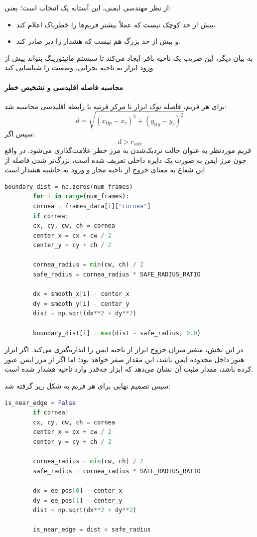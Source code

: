 \documentclass{article}
\begin{document}
از نظر مهندسی ایمنی، این آستانه یک انتخاب  است؛ یعنی:
\begin{itemize}
	\item بیش از حد کوچک نیست که عملاً بیشتر فریم‌ها را خطرناک اعلام کند،
	\item و بیش از حد بزرگ هم نیست که هشدار را دیر صادر کند.
\end{itemize}
به بیان دیگر، این ضریب یک ناحیه بافر ایجاد می‌کند تا سیستم مانیتورینگ بتواند پیش از ورود ابزار به ناحیه بحرانی، وضعیت را شناسایی کند.

\paragraph{محاسبه فاصله اقلیدسی و تشخیص خطر}
برای هر فریم، فاصله نوک ابزار تا مرکز قرنیه با رابطه اقلیدسی محاسبه شد:
\[
d = \sqrt{(x_{\text{tip}} - x_c)^2 + (y_{\text{tip}} - y_c)^2}
\]
سپس اگر:
\[
d > r_{\text{safe}}
\]
فریم موردنظر به عنوان حالت نزدیک‌شدن به مرز خطر علامت‌گذاری می‌شود. در واقع چون مرز ایمن به صورت یک دایره داخلی تعریف شده است، بزرگ‌تر شدن فاصله از این شعاع به معنای خروج از ناحیه مجاز و ورود به حاشیه هشدار است.


\begin{latin}
	\begin{lstlisting}[language=Python, basicstyle=\ttfamily\scriptsize]
		boundary_dist = np.zeros(num_frames)
		for i in range(num_frames):
		cornea = frames_data[i]["cornea"]
		if cornea:
		cx, cy, cw, ch = cornea
		center_x = cx + cw / 2
		center_y = cy + ch / 2
		
		cornea_radius = min(cw, ch) / 2
		safe_radius = cornea_radius * SAFE_RADIUS_RATIO
		
		dx = smooth_x[i] - center_x
		dy = smooth_y[i] - center_y
		dist = np.sqrt(dx**2 + dy**2)
		
		boundary_dist[i] = max(dist - safe_radius, 0.0)
	\end{lstlisting}
\end{latin}

در این بخش، متغیر  میزان خروج ابزار از ناحیه ایمن را اندازه‌گیری می‌کند. اگر ابزار هنوز داخل محدوده ایمن باشد، این مقدار صفر خواهد بود؛ اما اگر از مرز ایمن عبور کرده باشد، مقدار مثبت آن نشان می‌دهد که ابزار چه‌قدر وارد ناحیه هشدار شده است.

سپس تصمیم نهایی برای هر فریم به شکل زیر گرفته شد:


\begin{latin}
	\begin{lstlisting}[language=Python, basicstyle=\ttfamily\scriptsize]
		is_near_edge = False
		if cornea:
		cx, cy, cw, ch = cornea
		center_x = cx + cw / 2
		center_y = cy + ch / 2
		
		cornea_radius = min(cw, ch) / 2
		safe_radius = cornea_radius * SAFE_RADIUS_RATIO
		
		dx = ee_pos[0] - center_x
		dy = ee_pos[1] - center_y
		dist = np.sqrt(dx**2 + dy**2)
		
		is_near_edge = dist > safe_radius
	\end{lstlisting}
\end{latin}
\end{document}
